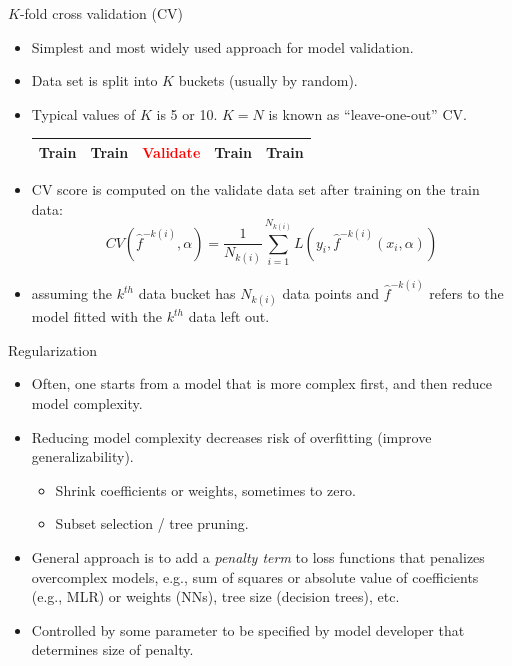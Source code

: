 \documentclass{beamer}
\begin{document}
\begin{frame}{$K$-fold cross validation (CV)}
    \begin{itemize}
        \item Simplest and most widely used approach for model validation.
        \item Data set is split into $K$ buckets (usually by random).
        \item Typical values of $K$ is 5 or 10. $K = N$ is known as ``leave-one-out'' CV.
        \begin{table}
        \begin{tabular}{|p{1.7cm}|p{1.7cm}|p{1.7cm}|p{1.7cm}|p{1.7cm}|}
            \hline
            \Large{Train} & \Large{Train} & \textcolor{red}{\Large{Validate}} & \Large{Train} & \Large{Train}\\
            \hline
        \end{tabular}
        \end{table}
        \item CV score is computed on the validate data set after training on the train data:
        \begin{equation*}
                CV(\hat{f}^{-k(i)},\alpha) = \frac{1}{N_{k(i)}}\sum_{i=1}^{N_{k(i)}} L(y_i, \hat{f}^{-k(i)}(x_i,\alpha))
        \end{equation*}
        \item assuming the $k^{th}$ data bucket has $N_{k(i)}$ data points and $\hat{f}^{-k(i)}$ refers to the model fitted with the $k^{th}$ data left out.
    \end{itemize}
\end{frame}


\begin{frame}{Regularization}
    \begin{itemize}
        \item Often, one starts from a model that is more complex first, and then reduce model complexity.
        \item Reducing model complexity decreases risk of overfitting (improve generalizability).
        \begin{itemize}
            \item Shrink coefficients or weights, sometimes to zero.
            \item Subset selection / tree pruning.
        \end{itemize}
        \item General approach is to add a \textit{penalty term} to loss functions that penalizes overcomplex models, e.g., sum of squares or absolute value of coefficients (e.g., MLR) or weights (NNs), tree size (decision trees), etc.
        \item Controlled by some parameter to be specified by model developer that determines size of penalty.
    \end{itemize}
\end{frame}
\end{document}
